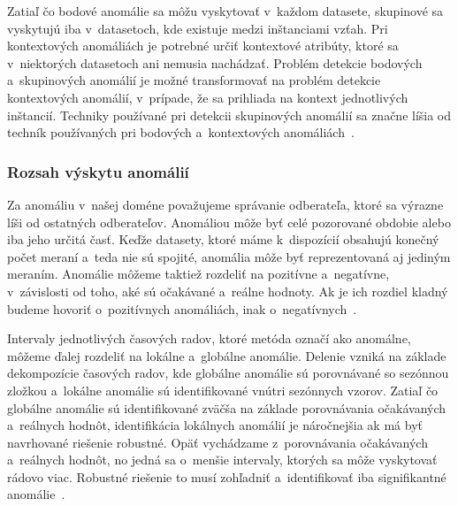 \documentclass[a4paper,twoside,slovak,12pt,appendix]{article}
\begin{document}
\noindent
Zatiaľ čo bodové anomálie sa môžu vyskytovať v~každom datasete, skupinové sa
vyskytujú iba v~datasetoch, kde existuje medzi inštanciami vzťah. Pri
kontextových anomáliách je potrebné určiť kontextové atribúty, ktoré sa
v~niektorých datasetoch ani nemusia nachádzať. Problém detekcie bodových
a~skupinových anomálií je možné transformovať na problém detekcie kontextových
anomálií, v~prípade, že sa prihliada na kontext jednotlivých inštancií. Techniky
používané pri detekcii skupinových anomálií sa značne líšia od techník
používaných pri bodových a~kontextových
anomáliách~\cite{Chandola2009,Goldberger2000}.


\subsubsection{Rozsah výskytu anomálií}
Za anomáliu v~našej doméne považujeme správanie odberateľa, ktoré sa výrazne
líši od ostatných odberateľov. Anomáliou môže byť celé pozorované obdobie alebo
iba jeho určitá časť. Keďže datasety, ktoré máme k~dispozícií obsahujú konečný
počet meraní a~teda nie sú spojité, anomália môže byť reprezentovaná aj jediným
meraním. Anomálie môžeme taktiež rozdeliť na pozitívne a~negatívne, v~závislosti
od toho, aké sú očakávané a~reálne hodnoty. Ak je ich rozdiel kladný budeme
hovoriť o~pozitívnych anomáliách, inak o~negatívnych~\cite{Kejariwal2015}.

Intervaly jednotlivých časových radov, ktoré metóda označí ako anomálne, môžeme
ďalej rozdeliť na lokálne a~globálne anomálie. Delenie vzniká na základe
dekompozície časových radov, kde globálne anomálie sú porovnávané so
sezónnou zložkou a~lokálne anomálie sú identifikované vnútri sezónnych vzorov.
Zatiaľ čo globálne anomálie sú identifikované zväčša na základe porovnávania
očakávaných a~reálnych hodnôt, identifikácia lokálnych anomálií je náročnejšia
ak má byť navrhované riešenie robustné. Opäť vychádzame z~porovnávania
očakávaných a~reálnych hodnôt, no jedná sa o~menšie intervaly, ktorých sa môže
vyskytovať rádovo viac. Robustné riešenie to musí zohľadniť a~identifikovať iba
signifikantné anomálie~\cite{Kejariwal2015}.

\end{document}
